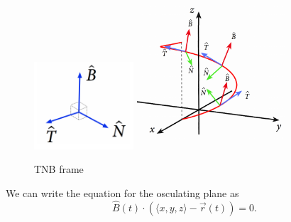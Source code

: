 \begin{figure}[H]
	\label{osculating_plane_circle}
	\centering
	\includegraphics[width = 0.33\textwidth]{./vectorValuedFunctions/TNB1.png}
	\includegraphics[width = 0.5\textwidth]{./vectorValuedFunctions/TNB2.png}
	\caption{TNB frame}
\end{figure}

\noindent
We can write the equation for the osculating plane as
\begin{equation*}
	\hat{B}(t)\cdot\left(\langle x,y,z\rangle - \vec{r}(t)\right) = 0.
\end{equation*}